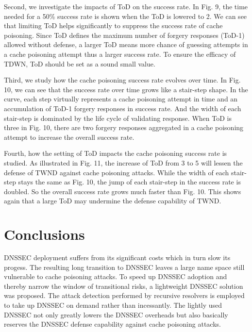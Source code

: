 \documentclass[conference]{IEEEtran}
\begin{document}
Second, we investigate the impacts of ToD on the success rate. In Fig. 9, the time needed for a 50\% success rate is shown when the ToD is lowered to 2. We can see that limiting ToD helps significantly to suppress the success rate of cache poisoning. Since ToD defines the maximum number of forgery responses (ToD-1) allowed without defense, a larger ToD means more chance of guessing attempts in a cache poisoning attempt thus a larger success rate. To ensure the efficacy of TDWN,  ToD should be set as a sound small value.


Third, we study how the cache poisoning success rate evolves over time. In Fig. 10, we can see that the success rate over time grows like a stair-step shape. In the curve, each step virtually represents a cache poisoning attempt in time and an accumulation of ToD-1 forgery responses in success rate. And the width of each stair-step is dominated by the life cycle of validating response. When ToD is three in Fig. 10, there are two forgery responses aggregated in a cache poisoning attempt to increase the overall success rate.


Fourth, how the setting of ToD impacts the cache poisoning success rate is studied. As illustrated in Fig. 11, the increase of ToD from 3 to 5 will lessen the defense of TWND against cache poisoning attacks. While the width of each stair-step stays the same as Fig. 10, the jump of each stair-step in the success rate is doubled. So the overall success rate grows much faster than Fig. 10.  This shows again that a large ToD may undermine the defense capability of TWND.

\section{Conclusions}

DNSSEC deployment suffers from its significant costs which in turn slow its progess. The resulting long transition to DNSSEC leaves a large name space still vulnerable to cache poisoning attacks. To speed up DNSSEC adoption and thereby narrow the window of transitional risks, a lightweight DNSSEC solution was proposed. The attack detection performed by recursive resolvers is employed to take up DNSSEC on demand rather than incessantly. The lightly used DNSSEC not only greatly lowers the DNSSEC overheads but also basically reserves the DNSSEC defense capability against cache poisoning attacks. 
\end{document}
